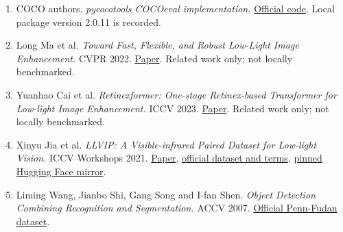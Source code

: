 \documentclass[11pt,a4paper]{article}
\begin{document}
\begin{enumerate}
\item COCO authors. \emph{pycocotools COCOeval implementation.} \href{https://github.com/cocodataset/cocoapi/blob/master/PythonAPI/pycocotools/cocoeval.py}{Official code}. Local package version 2.0.11 is recorded.
\item Long Ma et al. \emph{Toward Fast, Flexible, and Robust Low-Light Image Enhancement.} CVPR 2022. \href{https://arxiv.org/abs/2204.10137}{Paper}. Related work only; not locally benchmarked.
\item Yuanhao Cai et al. \emph{Retinexformer: One-stage Retinex-based Transformer for Low-light Image Enhancement.} ICCV 2023. \href{https://arxiv.org/abs/2303.06705}{Paper}. Related work only; not locally benchmarked.

\item Xinyu Jia et al. \emph{LLVIP: A Visible-infrared Paired Dataset for Low-light Vision.} ICCV Workshops 2021. \href{https://arxiv.org/abs/2108.10831}{Paper}, \href{https://github.com/bupt-ai-cz/LLVIP}{official dataset and terms}, \href{https://huggingface.co/datasets/McCheng/LLVIP/tree/e50976add2fcca00b0db0f3bba59ed486d8c1f6d}{pinned Hugging Face mirror}.
\item Liming Wang, Jianbo Shi, Gang Song and I-fan Shen. \emph{Object Detection Combining Recognition and Segmentation.} ACCV 2007. \href{https://www.cis.upenn.edu/\textasciitilde{}jshi/ped\_html/}{Official Penn-Fudan dataset}.
\end{enumerate}
\end{document}
